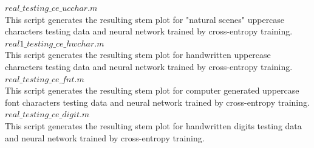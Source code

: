 \documentclass[journal,a4paper,onecolumn,11pt]{IEEEtran}
\begin{document}
$real\_testing\_ce\_ucchar.m$\\
This script generates the resulting stem plot for "natural scenes" uppercase characters testing data and neural network trained by cross-entropy training.\\ 
$real1\_testing\_ce\_hwchar.m$\\
This script generates the resulting stem plot for handwritten uppercase characters testing data and neural network trained by cross-entropy training.\\ 
$real\_testing\_ce\_fnt.m$\\
This script generates the resulting stem plot for  computer generated uppercase font characters testing data and neural network trained by cross-entropy training.\\ 
$real\_testing\_ce\_digit.m$\\
This script generates the resulting stem plot for handwritten digits testing data and neural network trained by cross-entropy training.\\ 
\end{document}
